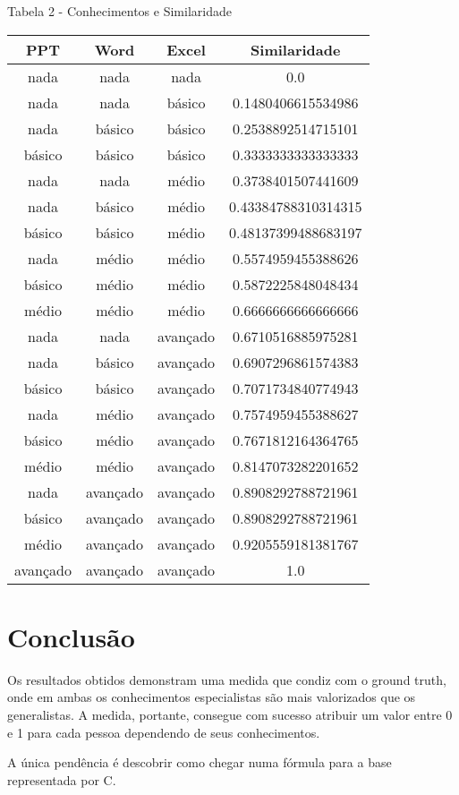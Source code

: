 \documentclass[]{article}
\begin{document}
		\begin{center}
			Tabela 2 - Conhecimentos e Similaridade
			
			\begin{tabular}{|c c c | c|} 
				\hline
				PPT & Word & Excel & Similaridade \\ [0.5ex] 
				\hline\hline
				nada & nada & nada & 0.0 \\
				\hline
				nada & nada & básico & 0.1480406615534986 \\
				\hline
				nada & básico & básico & 0.2538892514715101 \\
				\hline
				básico & básico & básico & 0.3333333333333333 \\
				\hline
				nada & nada & médio & 0.3738401507441609 \\
				\hline
				nada & básico & médio & 0.43384788310314315 \\
				\hline
				básico & básico & médio & 0.48137399488683197 \\
				\hline
				nada & médio & médio & 0.5574959455388626 \\
				\hline
				básico & médio & médio & 0.5872225848048434 \\
				\hline
				médio & médio & médio & 0.6666666666666666 \\
				\hline
				nada & nada & avançado & 0.6710516885975281 \\
				\hline
				nada & básico & avançado & 0.6907296861574383 \\
				\hline
				básico & básico & avançado & 0.7071734840774943 \\
				\hline
				nada & médio & avançado & 0.7574959455388627 \\
				\hline
				básico & médio & avançado & 0.7671812164364765 \\
				\hline
				médio & médio & avançado & 0.8147073282201652 \\
				\hline
				nada & avançado & avançado & 0.8908292788721961 \\
				\hline
				básico & avançado & avançado & 0.8908292788721961 \\
				\hline
				médio & avançado & avançado & 0.9205559181381767 \\
				\hline
				avançado & avançado & avançado & 1.0 \\
				\hline
			\end{tabular}
		\end{center}

	\section{Conclusão}
	
	Os resultados obtidos demonstram uma medida que condiz com o ground truth, onde em ambas os conhecimentos especialistas são mais valorizados que os generalistas. A medida, portante, consegue com sucesso atribuir um valor entre 0 e 1 para cada pessoa dependendo de seus conhecimentos.
	
	A única pendência é descobrir como chegar numa fórmula para a base representada por C.
	
	\newpage	
\end{document}
